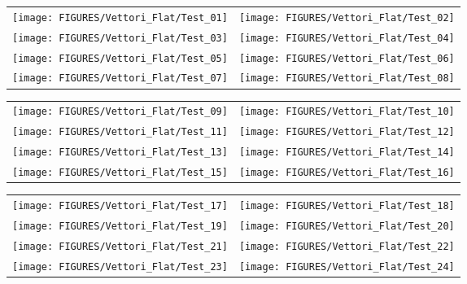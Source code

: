 \begin{figure}[p]
\begin{tabular*}{\textwidth}{l@{\extracolsep{\fill}}r}
\texttt{[image: FIGURES/Vettori\_Flat/Test\_01]} &
\texttt{[image: FIGURES/Vettori\_Flat/Test\_02]} \\
\texttt{[image: FIGURES/Vettori\_Flat/Test\_03]} &
\texttt{[image: FIGURES/Vettori\_Flat/Test\_04]} \\
\texttt{[image: FIGURES/Vettori\_Flat/Test\_05]} &
\texttt{[image: FIGURES/Vettori\_Flat/Test\_06]} \\
\texttt{[image: FIGURES/Vettori\_Flat/Test\_07]} &
\texttt{[image: FIGURES/Vettori\_Flat/Test\_08]} \\
\end{tabular*}
\label{Vettori_Plume_Temperature}
\end{figure}

\begin{figure}[p]
\begin{tabular*}{\textwidth}{l@{\extracolsep{\fill}}r}
\texttt{[image: FIGURES/Vettori\_Flat/Test\_09]} &
\texttt{[image: FIGURES/Vettori\_Flat/Test\_10]} \\
\texttt{[image: FIGURES/Vettori\_Flat/Test\_11]} &
\texttt{[image: FIGURES/Vettori\_Flat/Test\_12]} \\
\texttt{[image: FIGURES/Vettori\_Flat/Test\_13]} &
\texttt{[image: FIGURES/Vettori\_Flat/Test\_14]} \\
\texttt{[image: FIGURES/Vettori\_Flat/Test\_15]} &
\texttt{[image: FIGURES/Vettori\_Flat/Test\_16]} \\
\end{tabular*}
\label{Vettori_2}
\end{figure}

\begin{figure}[p]
\begin{tabular*}{\textwidth}{l@{\extracolsep{\fill}}r}
\texttt{[image: FIGURES/Vettori\_Flat/Test\_17]} &
\texttt{[image: FIGURES/Vettori\_Flat/Test\_18]} \\
\texttt{[image: FIGURES/Vettori\_Flat/Test\_19]} &
\texttt{[image: FIGURES/Vettori\_Flat/Test\_20]} \\
\texttt{[image: FIGURES/Vettori\_Flat/Test\_21]} &
\texttt{[image: FIGURES/Vettori\_Flat/Test\_22]} \\
\texttt{[image: FIGURES/Vettori\_Flat/Test\_23]} &
\texttt{[image: FIGURES/Vettori\_Flat/Test\_24]} \\
\end{tabular*}
\label{Vettori_3}
\end{figure}

